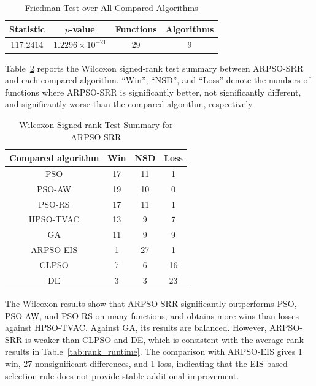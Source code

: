 \documentclass[conference]{IEEEtran}
\begin{document}
\begin{table}[!t]
\caption{Friedman Test over All Compared Algorithms}
\centering
\begin{tabular}{cccc}
\toprule
Statistic & $p$-value & Functions & Algorithms \\
\midrule
117.2414 & $1.2296\times10^{-21}$ & 29 & 9 \\
\bottomrule
\end{tabular}
\label{tab:friedman}
\end{table}

Table~\ref{tab:wilcoxon} reports the Wilcoxon signed-rank test summary between ARPSO-SRR and each compared algorithm. ``Win'', ``NSD'', and ``Loss'' denote the numbers of functions where ARPSO-SRR is significantly better, not significantly different, and significantly worse than the compared algorithm, respectively.

\begin{table}[!t]
\caption{Wilcoxon Signed-rank Test Summary for ARPSO-SRR}
\centering
\begin{tabular}{cccc}
\toprule
Compared algorithm & Win & NSD & Loss \\
\midrule
PSO & 17 & 11 & 1 \\
PSO-AW & 19 & 10 & 0 \\
PSO-RS & 17 & 11 & 1 \\
HPSO-TVAC & 13 & 9 & 7 \\
GA & 11 & 9 & 9 \\
ARPSO-EIS & 1 & 27 & 1 \\
CLPSO & 7 & 6 & 16 \\
DE & 3 & 3 & 23 \\
\bottomrule
\end{tabular}
\label{tab:wilcoxon}
\end{table}

The Wilcoxon results show that ARPSO-SRR significantly outperforms PSO, PSO-AW, and PSO-RS on many functions, and obtains more wins than losses against HPSO-TVAC. Against GA, its results are balanced. However, ARPSO-SRR is weaker than CLPSO and DE, which is consistent with the average-rank results in Table~\ref{tab:rank_runtime}. The comparison with ARPSO-EIS gives 1 win, 27 nonsignificant differences, and 1 loss, indicating that the EIS-based selection rule does not provide stable additional improvement.
\end{document}
